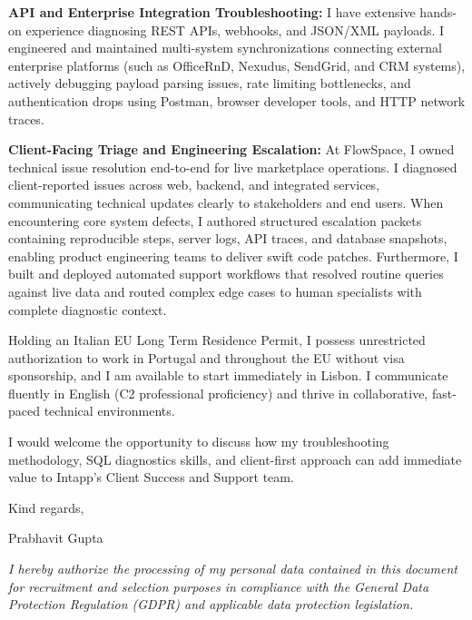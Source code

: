 \documentclass[10.5pt,a4paper]{article}
\begin{document}
\textbf{API and Enterprise Integration Troubleshooting:} I have extensive hands-on experience diagnosing REST APIs, webhooks, and JSON/XML payloads. I engineered and maintained multi-system synchronizations connecting external enterprise platforms (such as OfficeRnD, Nexudus, SendGrid, and CRM systems), actively debugging payload parsing issues, rate limiting bottlenecks, and authentication drops using Postman, browser developer tools, and HTTP network traces.

\textbf{Client-Facing Triage and Engineering Escalation:} At FlowSpace, I owned technical issue resolution end-to-end for live marketplace operations. I diagnosed client-reported issues across web, backend, and integrated services, communicating technical updates clearly to stakeholders and end users. When encountering core system defects, I authored structured escalation packets containing reproducible steps, server logs, API traces, and database snapshots, enabling product engineering teams to deliver swift code patches. Furthermore, I built and deployed automated support workflows that resolved routine queries against live data and routed complex edge cases to human specialists with complete diagnostic context.

Holding an Italian EU Long Term Residence Permit, I possess unrestricted authorization to work in Portugal and throughout the EU without visa sponsorship, and I am available to start immediately in Lisbon. I communicate fluently in English (C2 professional proficiency) and thrive in collaborative, fast-paced technical environments.

I would welcome the opportunity to discuss how my troubleshooting methodology, SQL diagnostics skills, and client-first approach can add immediate value to Intapp's Client Success and Support team.

Kind regards,

Prabhavit Gupta

\vspace{0.4em}
{\footnotesize \textit{I hereby authorize the processing of my personal data contained in this document for recruitment and selection purposes in compliance with the General Data Protection Regulation (GDPR) and applicable data protection legislation.}\par}
\end{document}
